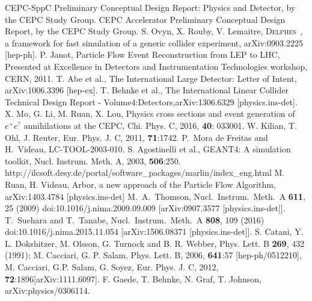 \documentclass[a4paper,10pt,twoside]{cpc-hepnp}
\begin{document}
\begin{thebibliography}{90}
CEPC-SppC Preliminary Conceptual Design Report: Physics and Detector, by the CEPC Study Group.
CEPC Accelerator Preliminary Conceptual Design Report, by the CEPC Study Group.
S. Ovyn, X. Rouby,  V. Lemaitre, {\textsc{Delphes}~}, a framework for fast simulation of a generic collider experiment, arXiv:0903.2225 [hep-ph].
P. Janot, Particle Flow Event Reconstruction from LEP to LHC, Presented at Excellence in Detectors and Instrumentation Technologies workshop, CERN, 2011.
T. Abe et al., The International Large Detector: Letter of Intent, arXiv:1006.3396 [hep-ex].
T. Behnke et al., The International Linear Collider Technical Design Report - Volume4:Detectors,arXiv:1306.6329 [physics.ins-det].
X. Mo, G. Li, M. Ruan, X. Lou, Physics cross sections and event generation of $e^+e^?$ annihilations at the CEPC, Chi. Phys. C, 2016, {\bf 40}: 033001.
W. Kilian, T. Ohl, J. Reuter, Eur. Phys. J. C, 2011, {\bf 71}:1742.
  P.~Mora de Freitas and H.~Videau, LC-TOOL-2003-010.
S. Agostinelli et al., GEANT4: A simulation toolkit, Nucl. Instrum. Meth. A, 2003, {\bf 506}:250.
 http://ilcsoft.desy.de/portal/software\_packages/marlin/index\_eng.html
M. Ruan, H. Videau, Arbor, a new approach of the Particle Flow Algorithm, arXiv:1403.4784 [physics.ins-det]
  M.~A.~Thomson,
  Nucl.\ Instrum.\ Meth.\ A {\bf 611}, 25 (2009)
  doi:10.1016/j.nima.2009.09.009
  [arXiv:0907.3577 [physics.ins-det]].
  T.~Suehara and T.~Tanabe,
  Nucl.\ Instrum.\ Meth.\ A {\bf 808}, 109 (2016)
  doi:10.1016/j.nima.2015.11.054
  [arXiv:1506.08371 [physics.ins-det]].
 S. Catani, Y. L. Dokshitzer, M. Olsson, G. Turnock and B. R. Webber, Phys. Lett. B {\bf 269}, 432 (1991);
M. Cacciari, G. P. Salam, Phys. Lett. B, 2006, {\bf 641}:57 [hep-ph/0512210], M. Cacciari, G.P. Salam, G. Soyez, Eur. Phys. J. C, 2012, {\bf 72}:1896[arXiv:1111.6097].
F. Gaede, T. Behnke, N. Graf, T. Johnson, arXiv:physics/0306114.

\end{thebibliography}

\clearpage
\end{document}
